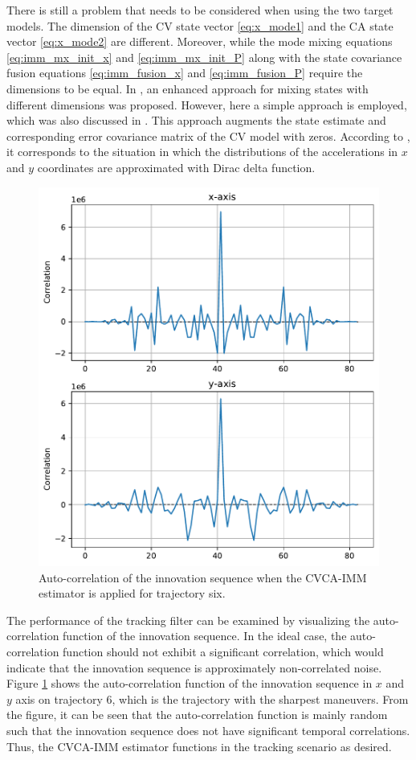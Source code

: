 \documentclass[english, 12pt, a4paper, elec, utf8, a-1b, online]{aaltothesis}
\begin{document}
There is still a problem that needs to be considered when using the two target models.
The dimension of the CV state vector \eqref{eq:x_mode1} and the CA state vector \eqref{eq:x_mode2} are different. 
Moreover, while the mode mixing equations \eqref{eq:imm_mx_init_x} and \eqref{eq:imm_mx_init_P} along with the state covariance fusion equations \eqref{eq:imm_fusion_x} and \eqref{eq:imm_fusion_P} require the dimensions to be equal.
In \cite{Granstroem2015}, an enhanced approach for mixing states with different dimensions was proposed.
However, here a simple approach is employed, which was also discussed in \cite{Granstroem2015}.
This approach augments the state estimate and corresponding error covariance matrix of the CV model with zeros.
According to \cite{Granstroem2015}, it corresponds to the situation in which the distributions of the accelerations in $x$ and $y$ coordinates are approximated with Dirac delta function.

\begin{figure}[bt]
    \centering
    \includegraphics[width=0.8\linewidth]{figures/benchmark/IMM/correlation_imm.pdf}
    \caption{Auto-correlation of the innovation sequence when the CVCA-IMM estimator is applied for trajectory six.}
    \label{fig:auto_correlation}
\end{figure}

The performance of the tracking filter can be examined by visualizing the auto-correlation function of the innovation sequence.
In the ideal case, the auto-correlation function should not exhibit a significant correlation, which would indicate that the innovation sequence is approximately non-correlated noise.
Figure \ref{fig:auto_correlation} shows the auto-correlation function of the innovation sequence in $x$ and $y$ axis on trajectory 6, which is the trajectory with the sharpest maneuvers.
From the figure, it can be seen that the auto-correlation function is mainly random such that the innovation sequence does not have significant temporal correlations.
Thus, the CVCA-IMM estimator functions in the tracking scenario as desired.
\end{document}
